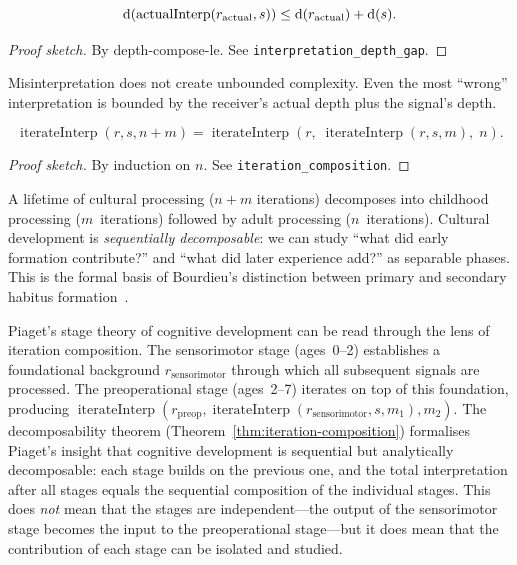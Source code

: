 \begin{theorem}
\label{thm:interp-depth-gap}
\[
  \operatorname{d}(\operatorname{actualInterp}(r_{\mathrm{actual}}, s))
  \leq \operatorname{d}(r_{\mathrm{actual}}) + \operatorname{d}(s).
\]
\end{theorem}

\begin{proof}[Proof sketch]
By depth-compose-le.  See \texttt{interpretation\_depth\_gap}.
\end{proof}

\begin{remark}
Misinterpretation does not create unbounded complexity.  Even the most
``wrong'' interpretation is bounded by the receiver's actual depth plus
the signal's depth.
\end{remark}

\begin{theorem}
\label{thm:iteration-composition}
\[
  \operatorname{iterateInterp}(r, s, n + m)
  = \operatorname{iterateInterp}(r,\;
    \operatorname{iterateInterp}(r, s, m),\; n).
\]
\end{theorem}

\begin{proof}[Proof sketch]
By induction on $n$.  See \texttt{iteration\_composition}.
\end{proof}

\begin{remark}
A lifetime of cultural processing ($n + m$ iterations) decomposes into
childhood processing ($m$~iterations) followed by adult processing
($n$~iterations).  Cultural development is \emph{sequentially
decomposable}: we can study ``what did early formation contribute?'' and
``what did later experience add?'' as separable phases.  This is the
formal basis of Bourdieu's distinction between primary and secondary
habitus formation~\cite{bourdieu1984}.
\end{remark}

\begin{remark}
Piaget's stage theory of cognitive development can be read through the
lens of iteration composition.  The sensorimotor stage (ages~0--2)
establishes a foundational background $r_{\mathrm{sensorimotor}}$
through which all subsequent signals are processed.  The preoperational
stage (ages~2--7) iterates on top of this foundation, producing
$\operatorname{iterateInterp}(r_{\mathrm{preop}},
\operatorname{iterateInterp}(r_{\mathrm{sensorimotor}}, s, m_1), m_2)$.
The decomposability theorem (Theorem~\ref{thm:iteration-composition})
formalises Piaget's insight that cognitive development is sequential but
analytically decomposable: each stage builds on the previous one, and
the total interpretation after all stages equals the sequential
composition of the individual stages.  This does \emph{not} mean that
the stages are independent---the output of the sensorimotor stage
becomes the input to the preoperational stage---but it does mean that
the contribution of each stage can be isolated and studied.
\end{remark}


